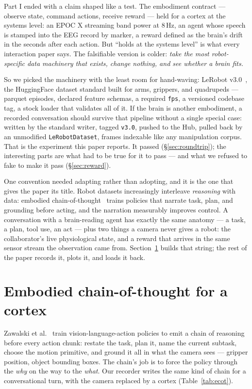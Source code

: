 \documentclass{article}
\begin{document}
Part I ended with a claim shaped like a test. The embodiment contract --- observe state, command actions, receive reward --- held for a cortex at the systems level: an EPOC X streaming band power at 8\,Hz, an agent whose speech is stamped into the EEG record by marker, a reward defined as the brain's drift in the seconds after each action. But ``holds at the systems level'' is what every interaction paper says. The falsifiable version is colder: \emph{take the most robot-specific data machinery that exists, change nothing, and see whether a brain fits.}

So we picked the machinery with the least room for hand-waving: LeRobot v3.0~\cite{cadene2024lerobot}, the HuggingFace dataset standard built for arms, grippers, and quadrupeds --- parquet episodes, declared feature schemas, a required \texttt{fps}, a versioned codebase tag, a stock loader that validates all of it. If the brain is another embodiment, a recorded conversation should survive that pipeline without a single special case: written by the standard writer, tagged \texttt{v3.0}, pushed to the Hub, pulled back by an unmodified \texttt{LeRobotDataset}, frames indexable like any manipulation corpus. That is the experiment this paper reports. It passed (\S\ref{sec:roundtrip}); the interesting parts are what had to be true for it to pass --- and what we refused to fake to make it pass (\S\ref{sec:reward}).

One convention needed adapting rather than adopting, and it is the one that gives the paper its title. Robot datasets increasingly interleave \emph{reasoning} with data: embodied chain-of-thought~\cite{zawalski2024ecot} trains policies that narrate task, plan, and grounding before acting, and the narration measurably improves control. A conversation with a brain-reading agent has exactly the same anatomy --- a task, a plan, tool use, an act --- plus two things a camera never gives a robot: the collaborator's live physiological state, and a reward that arrives in the same sensor stream the observation came from. Section~\ref{sec:ecot} builds that string; the rest of the paper records it, plots it, and loads it back.

\section{Embodied chain-of-thought for a cortex}
\label{sec:ecot}

Zawalski et al.~\cite{zawalski2024ecot} train vision-language-action policies to emit a chain of reasoning before every action chunk: restate the task, plan it, name the current subtask, choose the motion primitive, and ground it all in what the camera sees --- gripper position, object bounding boxes. The chain's job is to force the policy through the \emph{why} on the way to the \emph{what}. Our recorder writes the same kind of chain for a conversational turn, with the camera replaced by a cortex (Table~\ref{tab:ecot}).
\end{document}
